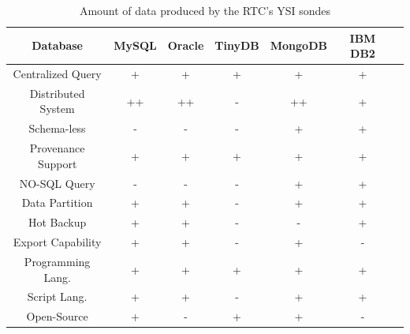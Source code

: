 \begin{table}
    \label{tab:ysi-data-distribution}
    \caption{Amount of data produced by the RTC's YSI sondes}
        \begin{center}
        \begin{tabular}{|c|c|c|c|c|c|c|}\hline 
        \textbf{Database} & \textbf{MySQL} & \textbf{Oracle} &
        \textbf{TinyDB} & \textbf{MongoDB} & \textbf{IBM DB2}\\\hline 
        Centralized Query & + & + & + & + & + \\\hline 
        Distributed System & ++ & ++ & - & ++ & +\\\hline 
        Schema-less & - & - & - & + & +\\\hline 
        Provenance Support & + & + & + & + & +\\\hline 
        NO-SQL Query & - & - & - & + & +\\\hline 
        Data Partition & + & + & - & + & +\\\hline 
        Hot Backup & + & + & - & - & +\\\hline 
        Export Capability & + & + & - & + & -\\\hline 
        Programming Lang. & + & + & + & + & +\\\hline
        Script Lang. & + & + & - & + & +\\\hline
        Open-Source & + & - & + & + & -\\\hline
        \end{tabular}
        \end{center}
\end{table}